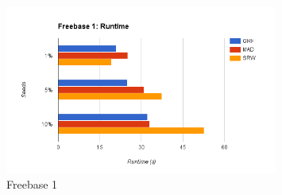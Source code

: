 \documentclass[12pt]{article}
\begin{document}
\begin{figure}[p]
    \includegraphics[width=0.8\textwidth]{figures/freebase1-runtime}
    \caption{Freebase 1}
\end{figure}

\begin{figure}[p]

\end{figure}
\end{document}

